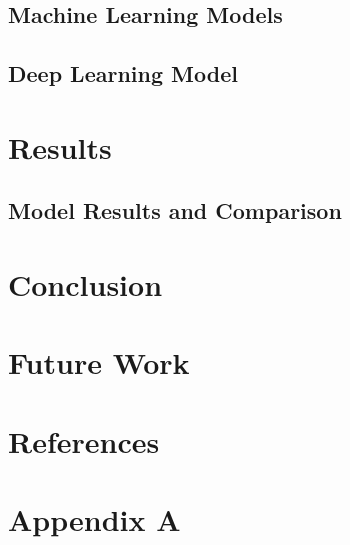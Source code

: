\documentclass[12pt]{article}
\begin{document}
	
	
	\subsection{Machine Learning Models}
	
	\subsection{Deep Learning Model}

\section{Results}
	\subsection{Model Results and Comparison}

\section{Conclusion}

\section{Future Work}

\section{References}

\section{Appendix A}
\end{document}

